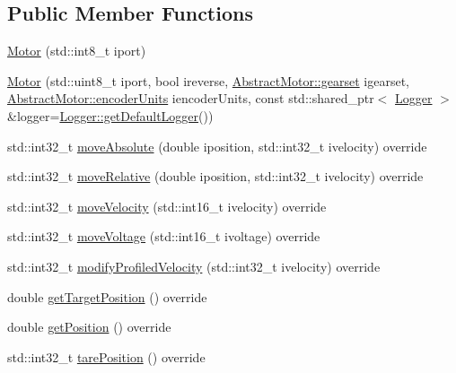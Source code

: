 \subsection*{Public Member Functions}
\begin{DoxyCompactItemize}
\item 
\mbox{\hyperlink{classokapi_1_1Motor_a6509ec14fe9e1c48c705fe74154873dd}{Motor}} (std\+::int8\+\_\+t iport)
\item 
\mbox{\hyperlink{classokapi_1_1Motor_a42ca0cde0ca0c3f987737385be9656f2}{Motor}} (std\+::uint8\+\_\+t iport, bool ireverse, \mbox{\hyperlink{classokapi_1_1AbstractMotor_a88aaa6ea2fa10f5520a537bbf26774d5}{Abstract\+Motor\+::gearset}} igearset, \mbox{\hyperlink{classokapi_1_1AbstractMotor_ae811cd825099f2defadeb1b7f7e7764c}{Abstract\+Motor\+::encoder\+Units}} iencoder\+Units, const std\+::shared\+\_\+ptr$<$ \mbox{\hyperlink{classokapi_1_1Logger}{Logger}} $>$ \&logger=\mbox{\hyperlink{classokapi_1_1Logger_a5053cf778b4b55acba788a3797dc96d2}{Logger\+::get\+Default\+Logger}}())
\item 
std\+::int32\+\_\+t \mbox{\hyperlink{classokapi_1_1Motor_a5f95fd5864805b57f16fa5defdbf1968}{move\+Absolute}} (double iposition, std\+::int32\+\_\+t ivelocity) override
\item 
std\+::int32\+\_\+t \mbox{\hyperlink{classokapi_1_1Motor_a40f6f70ed9b12d1834551d1232303ef1}{move\+Relative}} (double iposition, std\+::int32\+\_\+t ivelocity) override
\item 
std\+::int32\+\_\+t \mbox{\hyperlink{classokapi_1_1Motor_afc3377b9b10a72de0c22e9a74cbcfd16}{move\+Velocity}} (std\+::int16\+\_\+t ivelocity) override
\item 
std\+::int32\+\_\+t \mbox{\hyperlink{classokapi_1_1Motor_a64b53a041c90c7b7a3903c607a9b17eb}{move\+Voltage}} (std\+::int16\+\_\+t ivoltage) override
\item 
std\+::int32\+\_\+t \mbox{\hyperlink{classokapi_1_1Motor_a8778f90005a3add64d0dfd7574fb8289}{modify\+Profiled\+Velocity}} (std\+::int32\+\_\+t ivelocity) override
\item 
double \mbox{\hyperlink{classokapi_1_1Motor_af575af2b4d4cf5aea6e8aac50ef1cbbd}{get\+Target\+Position}} () override
\item 
double \mbox{\hyperlink{classokapi_1_1Motor_a4592f8a1cce4474f85ceabd3d7e2fe0b}{get\+Position}} () override
\item 
std\+::int32\+\_\+t \mbox{\hyperlink{classokapi_1_1Motor_aa71f3d93b734caec5c9245b211d4a0ad}{tare\+Position}} () override
\item 

\end{DoxyCompactItemize}
